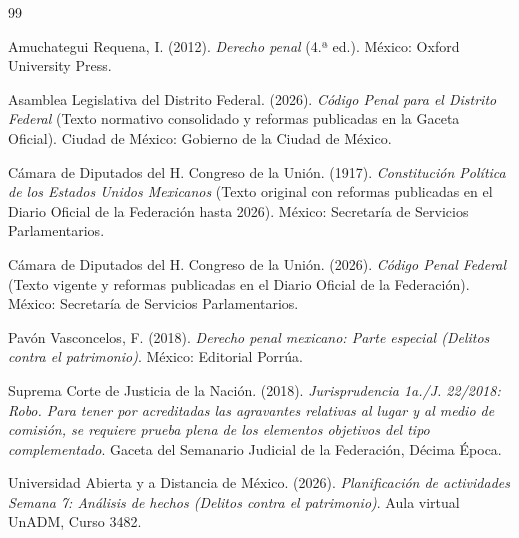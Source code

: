 \documentclass[spanish,letterpaper,oneside]{article}
\begin{document}
\clearpage
\begin{thebibliography}{99}

Amuchategui Requena, I. (2012). \emph{Derecho penal} (4.ª ed.). M\'exico: Oxford University Press.

Asamblea Legislativa del Distrito Federal. (2026). \emph{C\'odigo Penal para el Distrito Federal} (Texto normativo consolidado y reformas publicadas en la Gaceta Oficial). Ciudad de M\'exico: Gobierno de la Ciudad de M\'exico.

C\'amara de Diputados del H. Congreso de la Uni\'on. (1917). \emph{Constituci\'on Pol\'itica de los Estados Unidos Mexicanos} (Texto original con reformas publicadas en el Diario Oficial de la Federaci\'on hasta 2026). M\'exico: Secretar\'ia de Servicios Parlamentarios.

C\'amara de Diputados del H. Congreso de la Uni\'on. (2026). \emph{C\'odigo Penal Federal} (Texto vigente y reformas publicadas en el Diario Oficial de la Federaci\'on). M\'exico: Secretar\'ia de Servicios Parlamentarios.

Pav\'on Vasconcelos, F. (2018). \emph{Derecho penal mexicano: Parte especial (Delitos contra el patrimonio)}. M\'exico: Editorial Porr\'ua.

Suprema Corte de Justicia de la Naci\'on. (2018). \emph{Jurisprudencia 1a./J. 22/2018: Robo. Para tener por acreditadas las agravantes relativas al lugar y al medio de comisi\'on, se requiere prueba plena de los elementos objetivos del tipo complementado}. Gaceta del Semanario Judicial de la Federaci\'on, D\'ecima \'Epoca.

Universidad Abierta y a Distancia de M\'exico. (2026). \emph{Planificaci\'on de actividades Semana 7: An\'alisis de hechos (Delitos contra el patrimonio)}. Aula virtual UnADM, Curso 3482.

\end{thebibliography}
\end{document}
